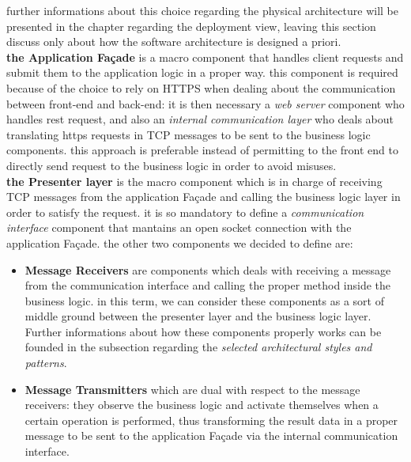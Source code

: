 further informations about this choice regarding the physical architecture will be presented in the chapter regarding the deployment view, leaving this section
discuss only about how the software architecture is designed a priori. \\

\textbf{the Application Façade} 
        is a macro component that handles client requests and submit them to the application logic in a proper way. this component is required because
        of the choice to rely on HTTPS when dealing about the communication between front-end and back-end: it is then necessary a \emph{web server} component who handles
        rest request, and also an \emph{internal communication layer} who deals about translating https requests in TCP messages to be sent to the business logic components.
        this approach is preferable instead of permitting to the front end to directly send request to the business logic in order to avoid misuses. \\
        
\textbf{the Presenter layer}
        is the macro component which is in charge of receiving TCP messages from the application Façade and calling the business logic layer in order to satisfy the request. it is so mandatory to define a \emph{communication interface} component that mantains an open socket connection with the application Façade. the other two components we decided to define are:
        \begin{itemize}
            \item \textbf{Message Receivers} are components which deals with receiving a message from the communication interface and calling the proper method inside the business logic. in this term, we can consider these components as a sort of middle ground between the presenter layer and the business logic layer. Further informations about how these components properly works can be founded in the subsection regarding the \emph{selected architectural styles and patterns}.
            \item \textbf{Message Transmitters} which are dual with respect to the message receivers: they observe the business logic and activate themselves when a certain operation is performed, thus transforming the result data in a proper message to be sent to the application Façade via the internal communication interface.
        \end{itemize}
        

